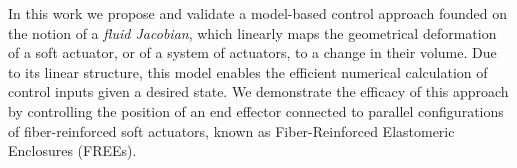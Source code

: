 In this work we propose and validate a model-based control approach founded on the notion of a \emph{fluid Jacobian}, which linearly maps the geometrical deformation of a soft actuator, or of a system of actuators, to a change in their volume. 
Due to its linear structure, this model enables the efficient numerical calculation of control inputs given a desired state.
We demonstrate the efficacy of this approach by controlling the position of an end effector connected to parallel configurations of fiber-reinforced soft actuators, known as Fiber-Reinforced Elastomeric Enclosures (FREEs). 













